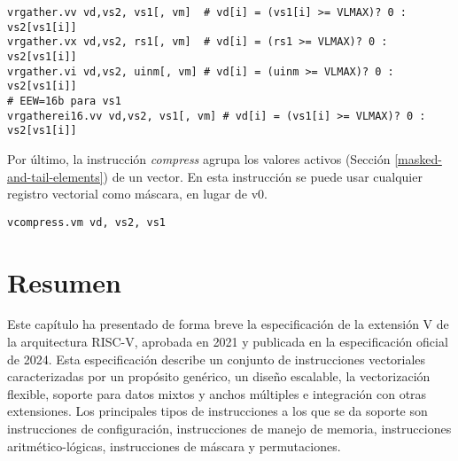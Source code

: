 \begin{lstlisting}
vrgather.vv vd,vs2, vs1[, vm]  # vd[i] = (vs1[i] >= VLMAX)? 0 : vs2[vs1[i]]
vrgather.vx vd,vs2, rs1[, vm]  # vd[i] = (rs1 >= VLMAX)? 0 : vs2[vs1[i]]
vrgather.vi vd,vs2, uinm[, vm] # vd[i] = (uinm >= VLMAX)? 0 : vs2[vs1[i]]
# EEW=16b para vs1
vrgatherei16.vv vd,vs2, vs1[, vm] # vd[i] = (vs1[i] >= VLMAX)? 0 : vs2[vs1[i]]
\end{lstlisting}

Por último, la instrucción \textit{compress} agrupa los valores activos
(Sección \ref{masked-and-tail-elements}) de un vector. En esta instrucción se puede
usar cualquier registro vectorial como máscara, en lugar de v0.

\begin{lstlisting}
vcompress.vm vd, vs2, vs1
\end{lstlisting}

\section{Resumen}
Este capítulo ha presentado de forma breve la especificación de la extensión V de la arquitectura RISC-V, aprobada en 2021 y publicada en la especificación oficial de 2024. Esta especificación describe un conjunto de instrucciones vectoriales caracterizadas por un propósito genérico, un diseño escalable, la vectorización flexible, soporte para datos mixtos y anchos múltiples e integración con otras extensiones. Los principales tipos de instrucciones a los que se da soporte son instrucciones de configuración, instrucciones de manejo de memoria, instrucciones aritmético-lógicas, instrucciones de máscara y permutaciones.  

